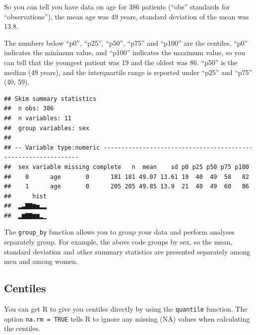 \documentclass[]{book}
\newenvironment{Shaded}{\begin{snugshade}}{\end{snugshade}}
\newcommand{\DataTypeTok}[1]{\textcolor[rgb]{0.13,0.29,0.53}{#1}}
\newcommand{\KeywordTok}[1]{\textcolor[rgb]{0.13,0.29,0.53}{\textbf{#1}}}
\newcommand{\NormalTok}[1]{#1}
\newcommand{\OperatorTok}[1]{\textcolor[rgb]{0.81,0.36,0.00}{\textbf{#1}}}
\newcommand{\OtherTok}[1]{\textcolor[rgb]{0.56,0.35,0.01}{#1}}
\newcommand{\StringTok}[1]{\textcolor[rgb]{0.31,0.60,0.02}{#1}}
\begin{document}
So you can tell you have data on age for 386 patients (``obs'' standards
for ``observations''), the mean age was 49 years, standard deviation of
the mean was 13.8.

The numbers below ``p0'', ``p25'', ``p50'', ``p75'' and ``p100'' are the
centiles. ``p0'' indicates the minimum value, and ``p100'' indicates the
maximum value, so you can tell that the youngest patient was 19 and the
oldest was 86. ``p50'' is the median (49 years), and the interquartile
range is reported under ``p25'' and ``p75'' (40, 59).

\begin{Shaded}
\end{Shaded}

\begin{verbatim}
## Skim summary statistics
##  n obs: 386 
##  n variables: 11 
##  group variables: sex 
## 
## -- Variable type:numeric ---------------------------------------------------------------
##  sex variable missing complete   n  mean    sd p0 p25 p50 p75 p100
##    0      age       0      181 181 49.07 13.61 19  40  49  58   82
##    1      age       0      205 205 49.85 13.9  21  40  49  60   86
##      hist
##  ▂▃▇▇▆▅▂▂
##  ▂▆▇▇▆▆▂▁
\end{verbatim}

The \texttt{group\_by} function allows you to group your data and
perform analyses separately group. For example, the above code groups by
sex, so the mean, standard deviation and other summary statistics are
presented separately among men and among women.

\hypertarget{centiles}{%
\subsection{Centiles}\label{centiles}}

You can get R to give you centiles directly by using the
\texttt{quantile} function. The option \texttt{na.rm\ =\ TRUE} tells R
to ignore any missing (NA) values when calculating the centiles.

\begin{Shaded}
\end{Shaded}
\end{document}
